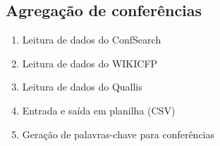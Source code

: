 \subsection{Agregação de conferências}
\begin{enumerate}
\item Leitura de dados do ConfSearch
\item Leitura de dados do WIKICFP
\item Leitura de dados do Quallis
\item Entrada e saída em planilha (CSV)
\item Geração de palavras-chave para conferências
\end{enumerate}